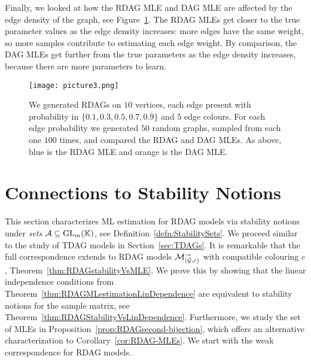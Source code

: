 Finally, we looked at how the RDAG MLE and DAG MLE are affected by the edge density of the graph, see Figure~\ref{fig:3}. The RDAG MLEs get closer to the true parameter values as the edge density increases: more edges have the same weight, so more samples contribute to estimating each edge weight. By comparison, the DAG MLEs get further from the true parameters as the edge density increases, because there are more parameters to learn.

\begin{figure}[ht]
	\centering
	\texttt{[image: picture3.png]}
	\caption{\cite[Figure~3]{RDAG} We generated RDAGs on $10$ vertices, each edge present with probability in $\{ 0.1, 0.3, 0.5, 0.7, 0.9\}$ and $5$ edge colours. For each edge probability we generated $50$ random graphs, sampled from each one $100$ times, and compared the RDAG and DAG MLEs. As above, blue is the RDAG MLE and orange is the DAG MLE.}
	\label{fig:3}
\end{figure}





\section{Connections to Stability Notions}\label{sec:RDAGsAndStability}


This section characterizes ML estimation for RDAG models via stability notions under \emph{sets} $\mathcal{A} \subseteq \operatorname{GL}_{m}(\mathbb K)$, see Definition~\ref{defn:StabilitySets}. We proceed similar to the study of TDAG models in Section~\ref{sec:TDAGs}. It is remarkable that the full correspondence extends to RDAG models $\mathcal{M}_{(\mathcal{G}, c)}^{\to}$ with compatible colouring $c$, Theorem~\ref{thm:RDAGstabilityVsMLE}. We prove this by showing that the linear independence conditions from Theorem~\ref{thm:RDAGMLestimationLinDependence} are equivalent to stability notions for the sample matrix, see Theorem~\ref{thm:RDAGStabilityVsLinDependence}. Furthermore, we study the set of MLEs in Proposition~\ref{prop:RDAGsecond-bijection}, which offers an alternative characterization to Corollary~\ref{cor:RDAG-MLEs}.
We start with the weak correspondence for RDAG models.


